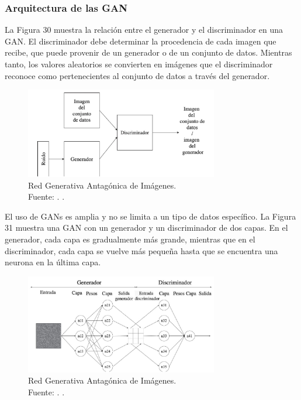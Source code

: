 \subsubsection{Arquitectura de las GAN}

La Figura 30 muestra la relación entre el generador y el discriminador en una GAN. El discriminador debe determinar la procedencia de cada imagen que recibe, que puede provenir de un generador o de un conjunto de datos. Mientras tanto, los valores aleatorios se convierten en imágenes que el discriminador reconoce como pertenecientes al conjunto de datos a través del generador. \parencite{tec_goodfellow2014gan}

\begin{figure}[!ht]
	\begin{center}
		\includegraphics[width=0.75\textwidth]{2/figures/redgan.jpg}
		\caption[Red Generativa Antagónica de Imágenes]{Red Generativa Antagónica de Imágenes.\\
		Fuente: \cite{tec_goodfellow2014gan}. .}
		\label{2:fig47}
	\end{center}
\end{figure}

El uso de GANs es amplia y no se limita a un tipo de datos específico. La Figura 31 muestra una GAN con un generador y un discriminador de dos capas. En el generador, cada capa es gradualmente más grande, mientras que en el discriminador, cada capa se vuelve más pequeña hasta que se encuentra una neurona en la última capa. \parencite{tec_goodfellow2014gan}

\begin{figure}[!ht]
	\begin{center}
		\includegraphics[width=0.75\textwidth]{2/figures/redgan2.jpg}
		\caption[Red Generativa Antagónica de Imágenes]{Red Generativa Antagónica de Imágenes.\\
		Fuente: \cite{tec_goodfellow2014gan}. .}
		\label{2:fig48}
	\end{center}
\end{figure}

